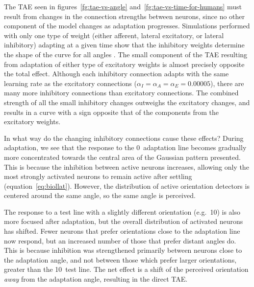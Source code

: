 \documentclass[10pt]{article}   %
\begin{document}
The TAE seen in figures~\ref{fg:tae-vs-angle}
and~\ref{fg:tae-vs-time-for-humans} must result from changes 
in the connection strengths between neurons, since no other
component of the model changes as adaptation progresses.
Simulations performed with only one type of weight (either afferent,
lateral excitatory, or lateral inhibitory) adapting at a given time
show that the inhibitory weights determine the shape of the curve for
all angles \cite{bednar:aitr97}.  The small component of the TAE
resulting from adaptation of either type of excitatory weights is
almost precisely opposite the total effect.
Although each inhibitory connection adapts with the same learning rate
as the excitatory connections ($\alpha_I=\alpha_A=\alpha_E=0.00005$),
there are many more inhibitory connections than excitatory
connections.  
The combined strength of all the small inhibitory changes outweighs
the excitatory changes, and results in a curve with a sign opposite
that of the components from the excitatory weights. 

In what way do the changing inhibitory connections cause these
effects?  During adaptation, we see that the response to the 0\degree\ 
adaptation line becomes gradually more concentrated towards the
central area of the Gaussian pattern presented.  This is because the
inhibition between active neurons increases, allowing only the most
strongly activated neurons to remain active after settling
(equation~\ref{eq:biollat}).  However, the distribution of active
orientation detectors is centered around the same angle, so 
the same angle is perceived.
  
The response to a test line with a slightly different orientation
(e.g.\ 10\degree) is also more focused after adaptation, but the overall
distribution of activated neurons has shifted.  Fewer neurons that
prefer orientations close to the adaptation line now respond, but an
increased number of those that prefer distant angles do.  This is
because inhibition was strengthened primarily between neurons close to
the adaptation angle, and not between those which prefer larger
orientations, greater than the 10\degree\ test line.  The net effect is a
shift of the perceived orientation {\em away\/} from the adaptation
angle, resulting in the direct TAE\@.
\end{document}
